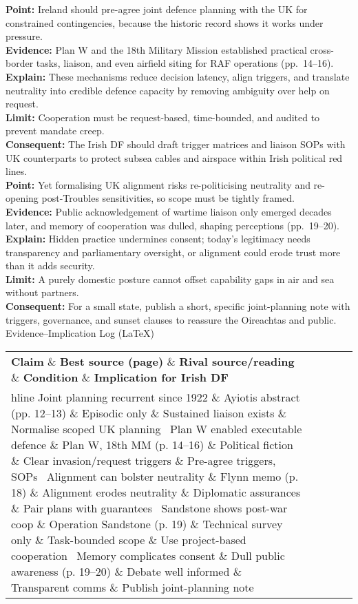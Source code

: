 \textbf{Point:} Ireland should pre-agree joint defence planning with the UK for constrained contingencies, because the historic record shows it works under pressure.\\
\textbf{Evidence:} Plan W and the 18th Military Mission established practical cross-border tasks, liaison, and even airfield siting for RAF operations (pp.~14--16).\\
\textbf{Explain:} These mechanisms reduce decision latency, align triggers, and translate neutrality into credible defence capacity by removing ambiguity over help on request.\\
\textbf{Limit:} Cooperation must be request-based, time-bounded, and audited to prevent mandate creep.\\
\textbf{Consequent:} The Irish DF should draft trigger matrices and liaison SOPs with UK counterparts to protect subsea cables and airspace within Irish political red lines.\\[1em]

\textbf{Point:} Yet formalising UK alignment risks re-politicising neutrality and re-opening post-Troubles sensitivities, so scope must be tightly framed.\\
\textbf{Evidence:} Public acknowledgement of wartime liaison only emerged decades later, and memory of cooperation was dulled, shaping perceptions (pp.~19--20).\\
\textbf{Explain:} Hidden practice undermines consent; today’s legitimacy needs transparency and parliamentary oversight, or alignment could erode trust more than it adds security.\\
\textbf{Limit:} A purely domestic posture cannot offset capability gaps in air and sea without partners.\\
\textbf{Consequent:} For a small state, publish a short, specific joint-planning note with triggers, governance, and sunset clauses to reassure the Oireachtas and public.\\

Evidence–Implication Log (LaTeX)

\begin{tabular}{p{3.2cm}p{4.2cm}p{3.6cm}p{3.2cm}p{4.2cm}}
	\textbf{Claim} \& \textbf{Best source (page)} \& \textbf{Rival source/reading} \& \textbf{Condition} \& \textbf{Implication for Irish DF}\\hline
	Joint planning recurrent since 1922 \& Ayiotis abstract (pp. 12–13) \& Episodic only \& Sustained liaison exists \& Normalise scoped UK planning \
	Plan W enabled executable defence \& Plan W, 18th MM (p. 14–16) \& Political fiction \& Clear invasion/request triggers \& Pre-agree triggers, SOPs \
	Alignment can bolster neutrality \& Flynn memo (p. 18) \& Alignment erodes neutrality \& Diplomatic assurances \& Pair plans with guarantees \
	Sandstone shows post-war coop \& Operation Sandstone (p. 19) \& Technical survey only \& Task-bounded scope \& Use project-based cooperation \
	Memory complicates consent \& Dull public awareness (p. 19–20) \& Debate well informed \& Transparent comms \& Publish joint-planning note \
\end{tabular}

